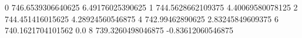 0 746.6539306640625 6.49176025390625
1 744.5628662109375 4.40069580078125
2 744.451416015625 4.28924560546875
4 742.99462890625 2.83245849609375
6 740.1621704101562 0.0
8 739.3260498046875 -0.83612060546875
